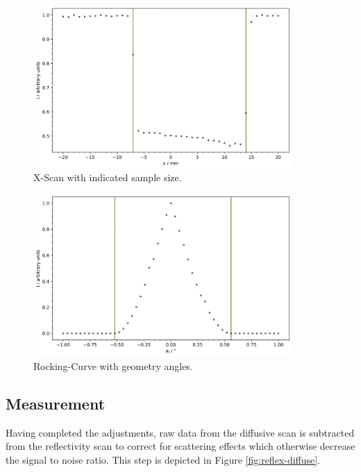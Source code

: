 \begin{figure}[H]
	\centering
	\includegraphics[width=0.88\textwidth]{content/plots/3.jpg}
	\caption{X-Scan with indicated sample size.}
	\label{fig:x-scan}
\end{figure}

\vspace{3em}

\begin{figure}[H]
	\centering
	\includegraphics[width=0.88\textwidth]{content/plots/4.jpg}
	\caption{Rocking-Curve with geometry angles.}
	\label{fig:rocking-curve}
\end{figure}



\subsection{Measurement}

Having completed the adjustments, raw data from the diffusive scan is subtracted from the reflectivity scan to correct for scattering
effects which otherwise decrease the signal to noise ratio. This step is depicted in Figure \ref{fig:reflex-diffuse}.

